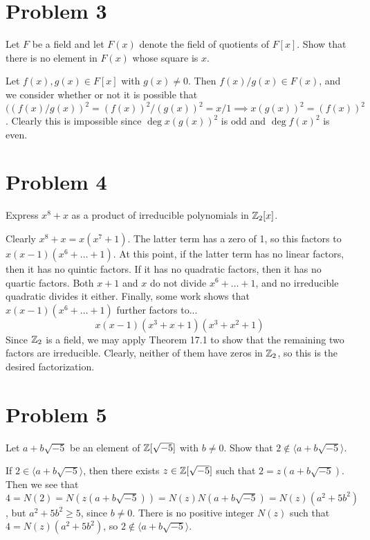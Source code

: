 \documentclass{article}
\begin{document}
\section*{Problem 3}

Let $F$ be a field and let $F(x)$ denote the field of quotients of $F[x]$.
Show that there is no element in $F(x)$ whose square is $x$.

Let $f(x),g(x)\in F[x]$ with $g(x)\neq 0$.  Then $f(x)/g(x)\in F(x)$,
and we consider whether or not it is possible that
$((f(x)/g(x))^2=(f(x))^2/(g(x))^2=x/1\implies x(g(x))^2=(f(x))^2$.
Clearly this is impossible since $\deg x(g(x))^2$ is odd and
$\deg f(x)^2$ is even.

\section*{Problem 4}

Express $x^8+x$ as a product of irreducible polynomials in $\mathbb{Z}_2[x]$.

Clearly $x^8+x=x(x^7+1)$.  The latter term has a zero of 1, so this
factors to $x(x-1)(x^6+\dots+1)$.  At this point, if the latter term
has no linear factors, then it has no quintic factors.  If it has no
quadratic factors, then it has no quartic factors.  
Both $x+1$ and $x$ do not divide $x^6+\dots+1$, and no irreducible
quadratic divides it either.
Finally, some work shows that $x(x-1)(x^6+\dots+1)$ further factors to...
\begin{equation*}
x(x-1)(x^3+x+1)(x^3+x^2+1)
\end{equation*}
Since $\mathbb{Z}_2$ is a field, we may apply Theorem 17.1 to show that the remaining
two factors are irreducible.  Clearly, neither of them have zeros in $\mathbb{Z}_2$,
so this is the desired factorization.

\section*{Problem 5}

Let $a+b\sqrt{-5}$ be an element of $\mathbb{Z}[\sqrt{-5}]$ with $b\neq 0$.
Show that $2\not\in\langle a+b\sqrt{-5}\rangle$.

If $2\in\langle a+b\sqrt{-5}\rangle$, then there exists $z\in\mathbb{Z}[\sqrt{-5}]$
such that $2=z(a+b\sqrt{-5})$.  Then we see that
$4=N(2)=N(z(a+b\sqrt{-5}))=N(z)N(a+b\sqrt{-5})=N(z)(a^2+5b^2)$, but
$a^2+5b^2\geq 5$, since $b\neq 0$.  There is no positive integer $N(z)$
such that $4=N(z)(a^2+5b^2)$, so $2\not\in\langle a+b\sqrt{-5}\rangle$.
\end{document}
